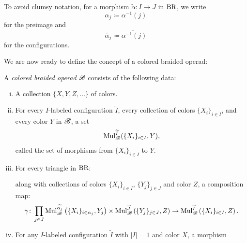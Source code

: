 \begin{nota}
    To avoid clumsy notation, for a morphism $\widetilde{\alpha} \colon I \to J$
    in $\operatorname{BR}$, we write
    $$\alpha_j \coloneqq \alpha^{-1}(j)$$ for the preimage and 
    $$\widetilde{\alpha_j} \coloneqq \widetilde{\alpha^{-1}(j)}$$ for the
    configurations.
\end{nota}

    

We are now ready to define the concept of a colored braided operad:   

\begin{defin}\label{def:col-br-op} A {\em colored braided operad} $\mathscr{B}$ consists
    of the following data:
    \begin{enumerate}[(i)]
        \item A collection $\{X,Y,Z, \dots\}$ of colors.
        \item For every $I$-labeled configuration $\widetilde{I}$, every
        collection of colors $\{X_i\}_{i \in I}$, and every color $Y$ in $\mathscr{B}$, a
        set
        \[
            \operatorname{Mul}_{\mathscr{B}}^{\widetilde{I}}(\{X_i\}_{i \in I}, Y),
        \]
        called the set of morphisms from $\{X_i\}_{i \in I}$ to $Y$.
        \item For every triangle in $\operatorname{BR}$:




        
        \begin{center}
        \end{center}
        along with collections of colors $\{X_i\}_{i \in I}$, $\{Y_j\}_{j \in
        J}$ and color $Z$, a composition map:
        \[
            \gamma \colon \prod_{j \in J} \operatorname{Mul}_{\mathscr{B}}^{\widetilde{\alpha_j}}\left(\{X_i\}_{i \in \alpha_j}, Y_j\right) \times \operatorname{Mul}_{\mathscr{B}}^{\widetilde{J}}\left(\{Y_j\}_{j\in J}, Z\right) \to \operatorname{Mul}_{\mathscr{B}}^{\widetilde{I}}\left(\{X_i\}_{i \in I}, Z\right).  
        \]
        \item For any $I$-labeled configuration $\widetilde{I}$ with $|I|=1$ and
        color $X$, a morphism


\end{enumerate}
\end{defin}
